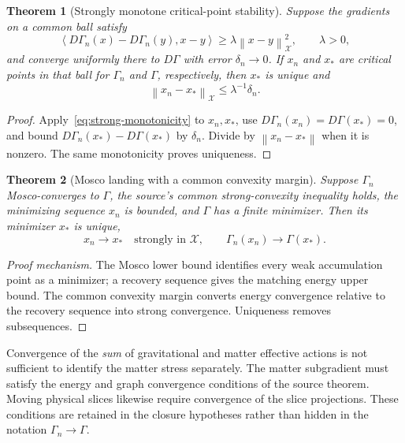 \documentclass[11pt,a4paper,oneside]{book}
\theoremstyle{plain}
\newtheorem{theorem}{Theorem}[chapter]
\theoremstyle{definition}
\theoremstyle{remark}
\newcommand{\XX}{\mathcal X}
\newcommand{\norm}[1]{\left\lVert#1\right\rVert}
\newcommand{\pair}[2]{\left\langle#1,#2\right\rangle}
\newcommand{\src}[2]{\cite{#1}}
\begin{document}
\begin{theorem}[Strongly monotone critical-point stability]
\label{thm:critical-stability}
Suppose the gradients on a common ball satisfy
\begin{equation}
 \pair{D\Gamma_n(x)-D\Gamma_n(y)}{x-y}
 \ge\lambda\norm{x-y}_{\XX}^2,\qquad\lambda>0,
 \label{eq:strong-monotonicity}
\end{equation}
and converge uniformly there to $D\Gamma$ with error $\delta_n\to0$. If $x_n$ and $x_*$ are critical points in that ball for $\Gamma_n$ and $\Gamma$, respectively, then $x_*$ is unique and
\begin{equation}
 \norm{x_n-x_*}_{\XX}\le\lambda^{-1}\delta_n.
 \label{eq:critical-stability}
\end{equation}
\end{theorem}
\begin{proof}
Apply~\eqref{eq:strong-monotonicity} to $x_n,x_*$, use $D\Gamma_n(x_n)=D\Gamma(x_*)=0$, and bound $D\Gamma_n(x_*)-D\Gamma(x_*)$ by $\delta_n$. Divide by $\norm{x_n-x_*}$ when it is nonzero. The same monotonicity proves uniqueness.
\end{proof}
\src{R18}{thm:v18v49-critical-convergence}

\begin{theorem}[Mosco landing with a common convexity margin]
\label{thm:mosco}
Suppose $\Gamma_n$ Mosco-converges to $\Gamma$, the source's common strong-convexity inequality holds, the minimizing sequence $x_n$ is bounded, and $\Gamma$ has a finite minimizer. Then its minimizer $x_*$ is unique,
\begin{equation}
 x_n\to x_*\quad\text{strongly in }\XX,
 \qquad \Gamma_n(x_n)\to\Gamma(x_*).
 \label{eq:mosco}
\end{equation}
\end{theorem}
\begin{proof}[Proof mechanism]
The Mosco lower bound identifies every weak accumulation point as a minimizer; a recovery sequence gives the matching energy upper bound. The common convexity margin converts energy convergence relative to the recovery sequence into strong convergence. Uniqueness removes subsequences.
\end{proof}
\src{R18}{thm:v18v50-minimizers}
Convergence of the \emph{sum} of gravitational and matter effective actions is not sufficient to identify the matter stress separately. The matter subgradient must satisfy the energy and graph convergence conditions of the source theorem. Moving physical slices likewise require convergence of the slice projections. These conditions are retained in the closure hypotheses rather than hidden in the notation $\Gamma_n\to\Gamma$.
\end{document}
